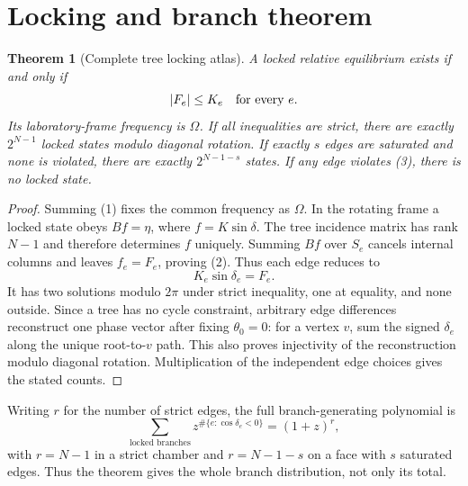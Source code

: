 \documentclass[10pt]{article}
\newtheorem{theorem}{Theorem}
\begin{document}
\section{Locking and branch theorem}
\begin{theorem}[Complete tree locking atlas]
A locked relative equilibrium exists if and only if
\begin{equation}
 |F_e|\le K_e\quad\hbox{for every }e.
\end{equation}
Its laboratory-frame frequency is $\Omega$.  If all inequalities are strict,
there are exactly $2^{N-1}$ locked states modulo diagonal rotation.  If
exactly $s$ edges are saturated and none is violated, there are exactly
$2^{N-1-s}$ states.  If any edge violates (3), there is no locked state.
\end{theorem}
\begin{proof}
Summing (1) fixes the common frequency as $\Omega$.  In the rotating frame a
locked state obeys $Bf=\eta$, where $f=K\sin\delta$.  The tree incidence
matrix has rank $N-1$ and therefore determines $f$ uniquely.  Summing $Bf$
over $S_e$ cancels internal columns and leaves $f_e=F_e$, proving (2).
Thus each edge reduces to
\begin{equation}
 K_e\sin\delta_e=F_e.
\end{equation}
It has two solutions modulo $2\pi$ under strict inequality, one at equality,
and none outside.  Since a tree has no cycle constraint, arbitrary edge
differences reconstruct one phase vector after fixing $\theta_0=0$: for a
vertex $v$, sum the signed $\delta_e$ along the unique root-to-$v$ path.
This also proves injectivity of the reconstruction modulo diagonal rotation.
Multiplication of the independent edge choices gives the stated counts.
\end{proof}

Writing $r$ for the number of strict edges, the full branch-generating
polynomial is
\begin{equation}
 \sum_{\text{locked branches}}z^{\#\{e:\cos\delta_e<0\}}
   =(1+z)^r,
\end{equation}
with $r=N-1$ in a strict chamber and $r=N-1-s$ on a face with $s$
saturated edges.  Thus the theorem gives the whole branch distribution, not
only its total.
\end{document}
